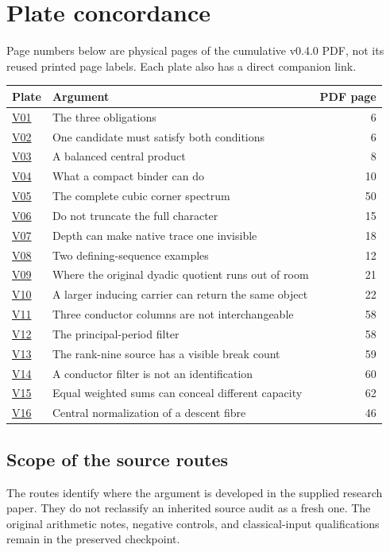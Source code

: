\documentclass[11pt]{article}
\begin{document}
\section*{Plate concordance}
Page numbers below are physical pages of the cumulative v0.4.0 PDF, not its reused printed page labels. Each plate also has a direct companion link.
\begin{center}\small\renewcommand{\arraystretch}{1.22}
\begin{tabular}{@{}p{.08\linewidth}p{.67\linewidth}r@{}}\toprule
Plate & Argument & PDF page\\\midrule
\hyperref[plate:V01]{V01} & The three obligations & 6 \\
\hyperref[plate:V02]{V02} & One candidate must satisfy both conditions & 6 \\
\hyperref[plate:V03]{V03} & A balanced central product & 8 \\
\hyperref[plate:V04]{V04} & What a compact binder can do & 10 \\
\hyperref[plate:V05]{V05} & The complete cubic corner spectrum & 50 \\
\hyperref[plate:V06]{V06} & Do not truncate the full character & 15 \\
\hyperref[plate:V07]{V07} & Depth can make native trace one invisible & 18 \\
\hyperref[plate:V08]{V08} & Two defining-sequence examples & 12 \\
\hyperref[plate:V09]{V09} & Where the original dyadic quotient runs out of room & 21 \\
\hyperref[plate:V10]{V10} & A larger inducing carrier can return the same object & 22 \\
\hyperref[plate:V11]{V11} & Three conductor columns are not interchangeable & 58 \\
\hyperref[plate:V12]{V12} & The principal-period filter & 58 \\
\hyperref[plate:V13]{V13} & The rank-nine source has a visible break count & 59 \\
\hyperref[plate:V14]{V14} & A conductor filter is not an identification & 60 \\
\hyperref[plate:V15]{V15} & Equal weighted sums can conceal different capacity & 62 \\
\hyperref[plate:V16]{V16} & Central normalization of a descent fibre & 46 \\
\bottomrule\end{tabular}\end{center}
\subsection*{Scope of the source routes}
The routes identify where the argument is developed in the supplied research paper. They do not reclassify an inherited source audit as a fresh one. The original arithmetic notes, negative controls, and classical-input qualifications remain in the preserved checkpoint.
\end{document}
